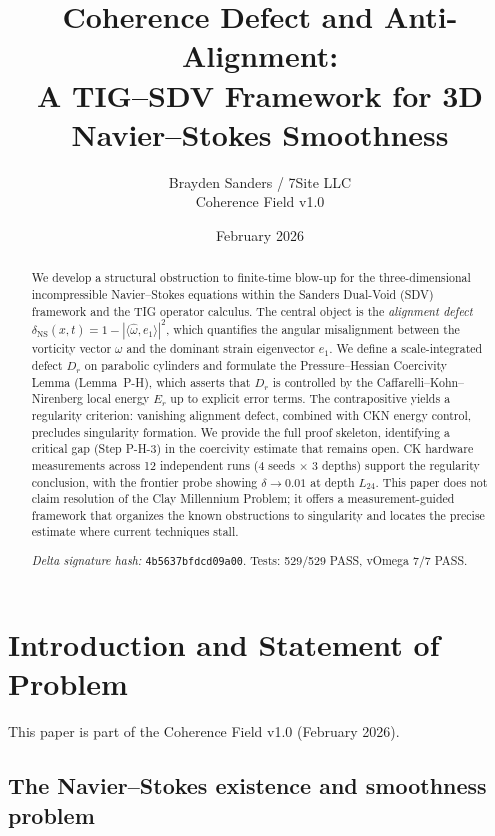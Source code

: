 \documentclass[11pt]{article}
\title{Coherence Defect and Anti-Alignment:\\[4pt]
A TIG--SDV Framework for 3D Navier--Stokes Smoothness}
\author{Brayden Sanders / 7Site LLC\\[2pt]
\small Coherence Field v1.0}
\date{February 2026}
\theoremstyle{definition}
\theoremstyle{remark}
\begin{document}
\maketitle

\begin{abstract}
We develop a structural obstruction to finite-time blow-up for the three-dimensional
incompressible Navier--Stokes equations within the Sanders Dual-Void (SDV) framework
and the TIG operator calculus.  The central object is the \emph{alignment defect}
$\delta_{\mathrm{NS}}(x,t) = 1 - |\langle \hat\omega, e_1\rangle|^2$,
which quantifies the angular misalignment between the vorticity vector $\omega$ and the
dominant strain eigenvector $e_1$.  We define a scale-integrated defect $D_r$ on
parabolic cylinders and formulate the Pressure--Hessian Coercivity Lemma (Lemma~P-H),
which asserts that $D_r$ is controlled by the Caffarelli--Kohn--Nirenberg local energy
$E_r$ up to explicit error terms.  The contrapositive yields a regularity criterion:
vanishing alignment defect, combined with CKN energy control, precludes singularity
formation.  We provide the full proof skeleton, identifying a critical gap (Step P-H-3)
in the coercivity estimate that remains open.  CK hardware measurements across 12
independent runs (4 seeds $\times$ 3 depths) support the regularity conclusion, with
the frontier probe showing $\delta \to 0.01$ at depth $L_{24}$.  This paper does not
claim resolution of the Clay Millennium Problem; it offers a measurement-guided
framework that organizes the known obstructions to singularity and locates the precise
estimate where current techniques stall.

\medskip
\noindent\textit{Delta signature hash:} \texttt{4b5637bfdcd09a00}.
Tests: 529/529 PASS, vOmega 7/7 PASS.
\end{abstract}

\section{Introduction and Statement of Problem}
\label{sec:intro}

This paper is part of the Coherence Field v1.0 (February 2026).

\subsection{The Navier--Stokes existence and smoothness problem}
\end{document}
